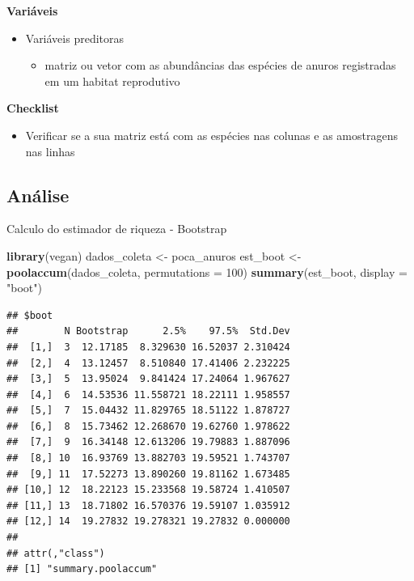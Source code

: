 \documentclass[
]{book}
\newenvironment{Shaded}{\begin{snugshade}}{\end{snugshade}}
\newcommand{\DataTypeTok}[1]{\textcolor[rgb]{0.13,0.29,0.53}{#1}}
\newcommand{\DecValTok}[1]{\textcolor[rgb]{0.00,0.00,0.81}{#1}}
\newcommand{\KeywordTok}[1]{\textcolor[rgb]{0.13,0.29,0.53}{\textbf{#1}}}
\newcommand{\NormalTok}[1]{#1}
\newcommand{\StringTok}[1]{\textcolor[rgb]{0.31,0.60,0.02}{#1}}
\providecommand{\tightlist}{%
  \setlength{\itemsep}{0pt}\setlength{\parskip}{0pt}}
\begin{document}
\textbf{Variáveis}

\begin{itemize}
\tightlist
\item
  Variáveis preditoras

  \begin{itemize}
  \tightlist
  \item
    matriz ou vetor com as abundâncias das espécies de anuros registradas em um habitat reprodutivo
  \end{itemize}
\end{itemize}

\textbf{Checklist}

\begin{itemize}
\tightlist
\item
  Verificar se a sua matriz está com as espécies nas colunas e as amostragens nas linhas
\end{itemize}

\hypertarget{anuxe1lise-5}{%
\subsection{Análise}\label{anuxe1lise-5}}

Calculo do estimador de riqueza - Bootstrap

\begin{Shaded}
\begin{Highlighting}[]
\KeywordTok{library}\NormalTok{(vegan)}
\NormalTok{dados_coleta <-}\StringTok{ }\NormalTok{poca_anuros}
\NormalTok{est_boot <-}\StringTok{ }\KeywordTok{poolaccum}\NormalTok{(dados_coleta, }\DataTypeTok{permutations =} \DecValTok{100}\NormalTok{)}
\KeywordTok{summary}\NormalTok{(est_boot, }\DataTypeTok{display =} \StringTok{"boot"}\NormalTok{)}
\end{Highlighting}
\end{Shaded}

\begin{verbatim}
## $boot
##        N Bootstrap      2.5%    97.5%  Std.Dev
##  [1,]  3  12.17185  8.329630 16.52037 2.310424
##  [2,]  4  13.12457  8.510840 17.41406 2.232225
##  [3,]  5  13.95024  9.841424 17.24064 1.967627
##  [4,]  6  14.53536 11.558721 18.22111 1.958557
##  [5,]  7  15.04432 11.829765 18.51122 1.878727
##  [6,]  8  15.73462 12.268670 19.62760 1.978622
##  [7,]  9  16.34148 12.613206 19.79883 1.887096
##  [8,] 10  16.93769 13.882703 19.59521 1.743707
##  [9,] 11  17.52273 13.890260 19.81162 1.673485
## [10,] 12  18.22123 15.233568 19.58724 1.410507
## [11,] 13  18.71802 16.570376 19.59107 1.035912
## [12,] 14  19.27832 19.278321 19.27832 0.000000
## 
## attr(,"class")
## [1] "summary.poolaccum"
\end{verbatim}
\end{document}
